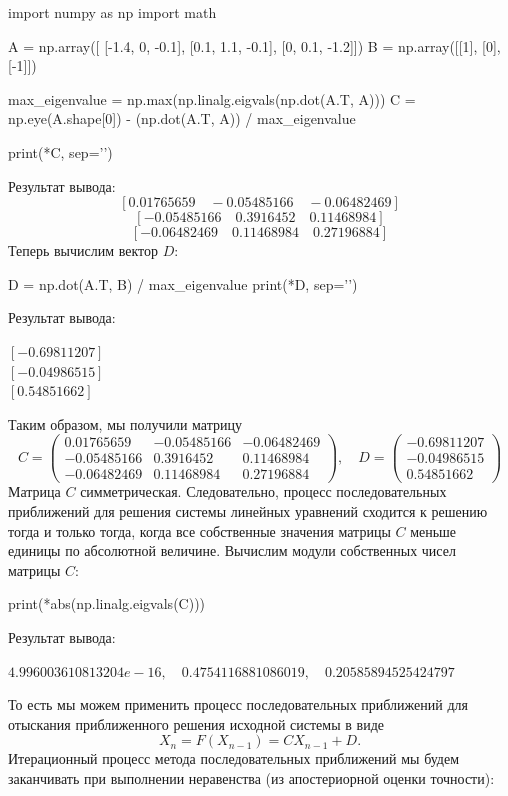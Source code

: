 \documentclass[a4paper, 12pt]{report}
\begin{document}
	\begin{python}
	import numpy as np
    import math

    A = np.array([
        [-1.4, 0, -0.1],
        [0.1, 1.1, -0.1],
        [0, 0.1, -1.2]])
    B = np.array([[1], [0], [-1]])

    max_eigenvalue = np.max(np.linalg.eigvals(np.dot(A.T, A)))
    C = np.eye(A.shape[0]) - (np.dot(A.T, A)) / max_eigenvalue

    print(*C, sep='\n')\end{python}
	Результат вывода:
	$$[ 0.01765659\quad  -0.05485166\quad -0.06482469]$$
	$$[ -0.05485166\quad  0.3916452\quad 0.11468984]$$
	$$[-0.06482469\quad 0.11468984\quad  0.27196884]$$
	Теперь вычислим вектор $D$:
	\begin{python}
    D = np.dot(A.T, B) / max_eigenvalue
	print(*D, sep='\n')\end{python}
	Результат вывода: \begin{center}
		$[-0.69811207]$\\
		$[-0.04986515]$\\
		$[0.54851662]$
	\end{center}
	Таким образом, мы получили матрицу $$C = \begin{pmatrix}
		0.01765659 &  -0.05485166 & -0.06482469\\
		-0.05485166 &  0.3916452 & 0.11468984\\
		-0.06482469 & 0.11468984 & 0.27196884
	\end{pmatrix},\quad D = \begin{pmatrix}
	-0.69811207\\
	-0.04986515\\
	0.54851662
	\end{pmatrix}$$
	Матрица $C$ симметрическая. Следовательно, процесс последовательных приближений для решения системы линейных уравнений сходится к решению тогда и только тогда, когда все собственные значения матрицы $C$ меньше единицы по абсолютной величине.
	Вычислим модули собственных чисел матрицы $C$:
	\begin{python}
		print(*abs(np.linalg.eigvals(C)))\end{python}
	Результат вывода:
	\begin{center}
		$4.996003610813204e-16,\quad 0.4754116881086019,\quad 0.20585894525424797$
	\end{center}
	То есть мы можем применить процесс последовательных приближений для отыскания приближенного решения исходной системы в виде $$X_n = F(X_{n-1}) = CX_{n-1} + D.$$
	Итерационный процесс метода последовательных приближений мы будем заканчивать при выполнении неравенства (из апостериорной оценки точности):
\end{document}
